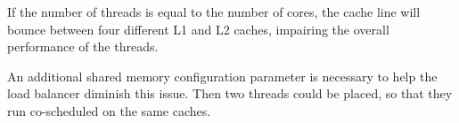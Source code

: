 If the number of threads is equal to the number of cores, the cache line will
bounce between four different L1 and L2 caches, impairing the overall
performance of the threads.

An additional shared memory configuration parameter is necessary to help the
load balancer diminish this issue.
Then two threads could be placed, so that they run co-scheduled on the same
caches.



\begin{comment}
\paragraph{Pseudo-code of placement algorithm}
  \begin{verbatim}
  from all threads:
    select #core highest LLC miss rate
    select #core highest exec-time
    intersection of both are critical threads
    if threads placed on different cores
      then do nothing
    else
      move higher LLC miss rate thread to other core
    do accounting

  forall threads left do:
    bin by priority levels
    sort each bin by miss rate

  forall prio-bin in prio-bin-list do:
    while threads in prio-bin
      dequeue highest miss rate
      sort cores by lowest accounted miss rate
      place max(#core, #threads left in bin) threads RR on cores;
  \end{verbatim}

  \paragraph{\gls{smt} abstraction code}
  \begin{verbatim}
  if SMT is enabled
    sort threads once by exec time and once by LLC miss
    while duplication:
      look at next LLC-miss thread and dequeue it from exec-time
      look at next exec-miss thread and dequeue it from LLC-miss

    while threads unassigned && queue not empty:
      dequeue one thread from LLC miss list for SMT#0
      dequeue one thread from LLC-miss list for SMT#1
      dequeue one thread from exe-time list for SMT#0
      dequeue one thread form exec-time list for SMT#1
  \end{verbatim}

  \paragraph{Minimize migration pseudo-code}
  \begin{verbatim}
  sort all threads by LLC-miss
  sliding window size #threads with less than 5% LLC miss difference
  if at least 2 threads in the current window are migrated
    if two threads are swaping cores
      don't do the migration
    ALTERNATIVELY
    if the from-core-to-core-matrix has entries on opposing fields
      swap the to-values of both entries
  \end{verbatim}

\end{comment}
